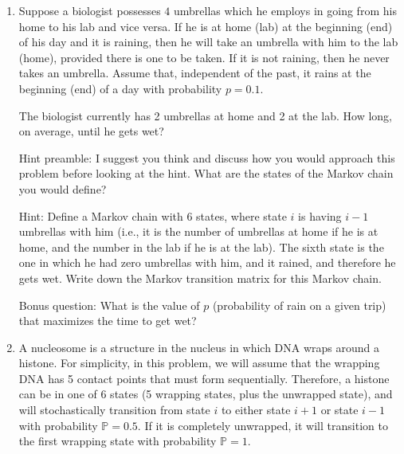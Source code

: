\documentclass[12pt,letterpaper]{article}
\begin{document}
\begin{enumerate}

\item

Suppose a biologist possesses $4$ umbrellas which he employs in going from his home to his lab and vice versa. 
If he is at home (lab) at the beginning (end) of his day and it is raining, then he will take an umbrella with him to the lab (home), provided there is one to be taken. 
If it is not raining, then he never takes an umbrella. 
Assume that, independent of the past, it rains at the beginning (end) of a day with probability $p=0.1$.

The biologist currently has 2 umbrellas at home and 2 at the lab. 
How long, on average, until he gets wet? 

\vspace{3em}

Hint preamble: I suggest you think and discuss how you would approach this problem before looking at the hint. What are the states of the Markov chain you would define?

Hint: Define a Markov chain with $6$ states, where state $i$ is having $i-1$ umbrellas with him (i.e., it is the number of umbrellas at home if he is at home, and the number in the lab if he is at the lab). The sixth state is the one in which he had zero umbrellas with him, and it rained, and therefore he gets wet. Write down the Markov transition matrix for this Markov chain. 

Bonus question: What is the value of $p$ (probability of rain on a given trip) that maximizes the time to get wet? 


\vspace{3em}


\item %

A nucleosome is a structure in the nucleus in which DNA wraps around a histone.
For simplicity, in this problem, we will assume that the wrapping DNA has 5 contact points that must form sequentially. 
Therefore, a histone can be in one of 6 states (5 wrapping states, plus the unwrapped state), and will stochastically transition from state $i$ to either state $i+1$ or state $i-1$ with probability $\mathbb{P}=0.5$.
If it is completely unwrapped, it will transition to the first wrapping state with probability $\mathbb{P}=1$.


\end{enumerate}
\end{document}
